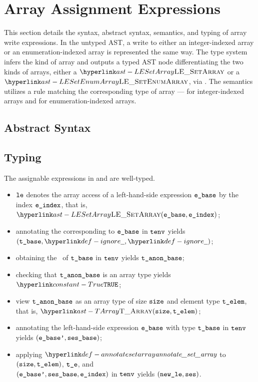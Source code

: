 \hypertarget{def-setarraylexprterm}{}
\section{Array Assignment Expressions\label{sec:ArrayAssignmentExpressions}}
This section details the syntax, abstract syntax, semantics, and typing of array write expressions.
In the untyped AST, a write to either an integer-indexed array or an enumeration-indexed array is represented
the same way. The type system infers the kind of array and outputs a typed AST node differentiating
the two kinds of arrays, either a $\LESetArray$ or a $\LESetEnumArray$, via .
The semantics utilizes a rule matching the corresponding type of array ---
 for integer-indexed arrays and
 for enumeration-indexed arrays.

\subsection{Abstract Syntax}

\subsection{Typing}
The assignable expressions in
 and 
are well-typed.

\ProseParagraph
\AllApply
\begin{itemize}
  \item $\texttt{le}$ denotes the array access of a left-hand-side expression $\texttt{e\_base}$ by the index $\texttt{e\_index}$, that is, $\LESetArray(\ebase, \eindex)$;
  \item annotating the \rhsexpression{} corresponding to $\texttt{e\_base}$ in $\texttt{tenv}$ yields \\ $(\tbase, \Ignore, \Ignore)$\ProseOrTypeError;
  \item obtaining the \underlyingtypeterm\ of $\texttt{t\_base}$ in $\texttt{tenv}$ yields $\texttt{t\_anon\_base}$\ProseOrTypeError;
  \item checking that $\texttt{t\_anon\_base}$ is an array type yields $\True$\ProseOrTypeError;
  \item view $\texttt{t\_anon\_base}$ as an array type of size $\texttt{size}$ and element type $\texttt{t\_elem}$, that is, $\TArray(\size, \telem)$;
  \item annotating the left-hand-side expression $\texttt{e\_base}$ with type $\texttt{t\_base}$ in $\texttt{tenv}$ yields $(\texttt{e\_base'}, \texttt{ses\_base})$\ProseOrTypeError;
  \item applying $\annotatesetarray$ to $(\texttt{size}, \texttt{t\_elem})$, $\texttt{t\_e}$, and \\
        $(\texttt{e\_base'}, \texttt{ses\_base}, \texttt{e\_index})$ in $\texttt{tenv}$ yields $(\texttt{new\_le}, \texttt{ses})$\ProseOrTypeError.
\end{itemize}

